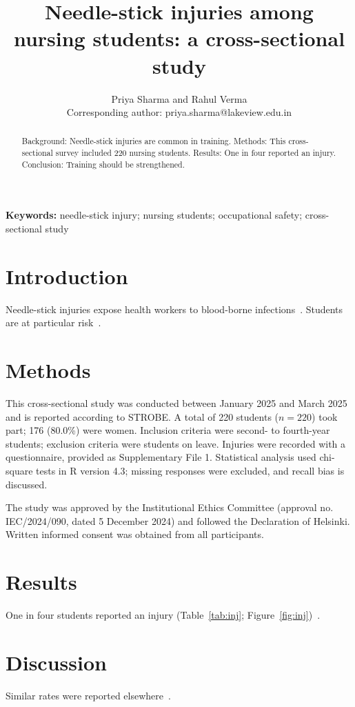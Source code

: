 \documentclass{article}
\title{Needle-stick injuries among nursing students: a cross-sectional study}
\author{Priya Sharma and Rahul Verma \\ Corresponding author: priya.sharma@lakeview.edu.in}
\newenvironment{keywords}{\par\noindent\textbf{Keywords:} }{\par}
\begin{document}
\maketitle
\begin{abstract}
Background: Needle-stick injuries are common in training. Methods: This cross-sectional survey included 220 nursing
students. Results: One in four reported an injury. Conclusion: Training should be strengthened.
\end{abstract}
\begin{keywords}
needle-stick injury; nursing students; occupational safety; cross-sectional study
\end{keywords}

\section{Introduction}
Needle-stick injuries expose health workers to blood-borne infections~\cite{sharma2021}. Students are at
particular risk~\cite{author2022,author2023}.

\section{Methods}
This cross-sectional study was conducted between January 2025 and March 2025 and is reported according to STROBE.
A total of 220 students ($n = 220$) took part; 176 (80.0\%) were women. Inclusion criteria were second- to
fourth-year students; exclusion criteria were students on leave. Injuries were recorded with a questionnaire,
provided as Supplementary File 1. Statistical analysis used chi-square tests in R version 4.3; missing responses
were excluded, and recall bias is discussed.

The study was approved by the Institutional Ethics Committee (approval no. IEC/2024/090, dated 5 December 2024)
and followed the Declaration of Helsinki. Written informed consent was obtained from all participants.

\section{Results}
One in four students reported an injury (Table~\ref{tab:inj}; Figure~\ref{fig:inj})~\cite{author2024}.

\section{Discussion}
Similar rates were reported elsewhere~\cite{author2024}.
\end{document}
